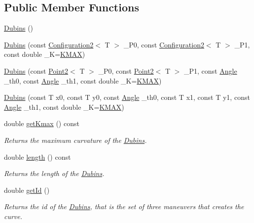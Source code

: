 \subsection*{Public Member Functions}
\begin{DoxyCompactItemize}
\item 
\mbox{\hyperlink{class_dubins_acc45a9db5f20150b58d4fc36ad1548fa}{Dubins}} ()
\item 
\mbox{\hyperlink{class_dubins_aa967d7d3009612ab99ac0b8e7ec33c83}{Dubins}} (const \mbox{\hyperlink{class_configuration2}{Configuration2}}$<$ T $>$ \+\_\+\+P0, const \mbox{\hyperlink{class_configuration2}{Configuration2}}$<$ T $>$ \+\_\+\+P1, const double \+\_\+K=\mbox{\hyperlink{dubins_8hh_a940b85a83458e94519f2685b33ddd276}{K\+M\+AX}})
\item 
\mbox{\hyperlink{class_dubins_a6120f64c71b7a37bc1051f9f87c02e9e}{Dubins}} (const \mbox{\hyperlink{class_point2}{Point2}}$<$ T $>$ \+\_\+\+P0, const \mbox{\hyperlink{class_point2}{Point2}}$<$ T $>$ \+\_\+\+P1, const \mbox{\hyperlink{class_angle}{Angle}} \+\_\+th0, const \mbox{\hyperlink{class_angle}{Angle}} \+\_\+th1, const double \+\_\+K=\mbox{\hyperlink{dubins_8hh_a940b85a83458e94519f2685b33ddd276}{K\+M\+AX}})
\item 
\mbox{\hyperlink{class_dubins_a8f2efa271286dda2c669988b600ac858}{Dubins}} (const T x0, const T y0, const \mbox{\hyperlink{class_angle}{Angle}} \+\_\+th0, const T x1, const T y1, const \mbox{\hyperlink{class_angle}{Angle}} \+\_\+th1, const double \+\_\+K=\mbox{\hyperlink{dubins_8hh_a940b85a83458e94519f2685b33ddd276}{K\+M\+AX}})
\item 
double \mbox{\hyperlink{class_dubins_aa3380b8d556cc954119e0c12dbe81194}{get\+Kmax}} () const
\begin{DoxyCompactList}\small\item\em Returns the maximum curvature of the \mbox{\hyperlink{class_dubins}{Dubins}}. \end{DoxyCompactList}\item 
double \mbox{\hyperlink{class_dubins_ae4978fe0667d364224c0a7521903a225}{length}} () const
\begin{DoxyCompactList}\small\item\em Returns the length of the \mbox{\hyperlink{class_dubins}{Dubins}}. \end{DoxyCompactList}\item 
double \mbox{\hyperlink{class_dubins_a5781212ce32e684018104d2c0676ceb6}{get\+Id}} ()
\begin{DoxyCompactList}\small\item\em Returns the id of the \mbox{\hyperlink{class_dubins}{Dubins}}, that is the set of three maneuvers that creates the curve. \end{DoxyCompactList}\item 

\end{DoxyCompactItemize}
